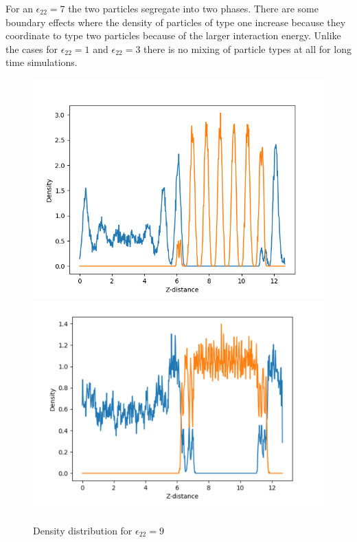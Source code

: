 \documentclass{article}
\begin{document}
		For an  $\epsilon _{22}=7$ the two particles segregate into two phases. There are some boundary effects where the density of particles of type one increase because they coordinate to type two particles because of the larger interaction energy. Unlike the cases for $\epsilon _{22}=1$ and $\epsilon _{22}=3$ there is no mixing of particle types at all for long time simulations.


		\begin{figure}[H]
				\centering
				\includegraphics[scale=0.5]{dens_eps9}
				\includegraphics[scale=0.25]{dens_eps9-2}
				\caption{Density distribution for $\epsilon _{22} = 9$}
		\end{figure}
\end{document}
